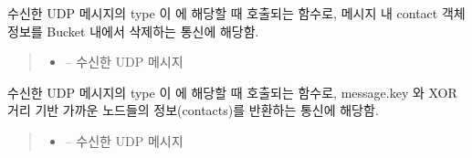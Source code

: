 \documentclass[a4paper,10pt,english]{sphinxmanual}
\begin{document}
\begin{fulllineitems}
\begin{fulllineitems}
\begin{itemize}
\end{itemize}



\end{fulllineitems}


\begin{fulllineitems}
\label{\detokenize{_kademlia:KNode._onDelete}}
\pysigstartsignatures
{}
\pysigstopsignatures
\sphinxAtStartPar
수신한 UDP 메시지의 type 이  에 해당할 때 호출되는 함수로,
메시지 내 contact 객체 정보를 Bucket 내에서 삭제하는 통신에 해당함.
\begin{quote}\begin{description}
\begin{itemize}
\item {} 
\sphinxAtStartPar
{} – 수신한 UDP 메시지

\end{itemize}

\end{description}\end{quote}

\end{fulllineitems}


\begin{fulllineitems}
\label{\detokenize{_kademlia:KNode._onFindNode}}
\pysigstartsignatures
{}
\pysigstopsignatures
\sphinxAtStartPar
수신한 UDP 메시지의 type 이  에 해당할 때 호출되는 함수로,
message.key 와 XOR 거리 기반 가까운 노드들의 정보(contacts)를 반환하는 통신에 해당함.
\begin{quote}\begin{description}
\begin{itemize}
\item {} 
\sphinxAtStartPar
{} – 수신한 UDP 메시지


\end{itemize}
\end{description}
\end{quote}
\end{fulllineitems}
\end{fulllineitems}
\end{document}
